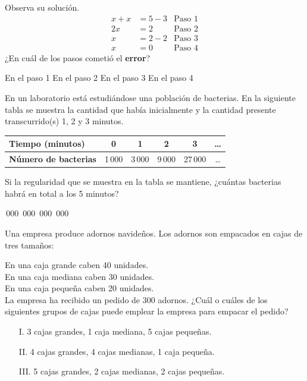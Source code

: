 \documentclass[10pt,letterpaper,addpoints]{exam}
\begin{document}
\begin{questions}
Observa su solución.
\begin{align*}
 x+x&=5-3 & \mbox{Paso 1}\\
 2x&=2 & \mbox{Paso 2}\\
  x&=2-2 & \mbox{Paso 3}\\
  x&=0 & \mbox{Paso 4}
\end{align*}
¿En cuál de los pasos cometió el \textbf{error}?

\begin{oneparchoices}
\choice En el paso 1
\choice En el paso 2
\CorrectChoice En el paso 3
\choice En el paso 4
\end{oneparchoices}
\question En un laboratorio está estudiándose una población de bacterias. En la siguiente tabla se muestra la cantidad que había inicialmente y la cantidad presente transcurrido(s) 1, 2 y 3 minutos.
\begin{center}
\begin{tabular}{|p{2cm}|c|c|c|c|c|}
\hline 
\textbf{Tiempo (minutos)} & \textbf{0} & \textbf{1} & \textbf{2} & \textbf{3} & \textbf{\ldots} \\ 
\hline 
\textbf{Número de bacterias} & 1\,000 & 3\,000 & 9\,000 & 27\,000 & \ldots \\ 
\hline 
\end{tabular} 
\end{center}
Si la regularidad que se muestra en la tabla se mantiene, ¿cuántas bacterias habrá en total a los 5 minutos?

\begin{oneparchoices}
\,000
\,000
\,000
\,000
\end{oneparchoices}
\question Una empresa produce adornos navideños. Los adornos son empacados en cajas de tres tamaños:

En una caja grande caben 40 unidades.\\
En una caja mediana caben 30 unidades.\\
En una caja pequeña caben 20 unidades.  \\

La empresa ha recibido un pedido de 300 adornos. ¿Cuál o cuáles de los siguientes grupos de cajas puede emplear la empresa para empacar el pedido?
\begin{itemize}
\item[I.] 3 cajas grandes, 1 caja mediana, 5 cajas pequeñas.
\item[II.] 4 cajas grandes, 4 cajas medianas, 1 caja pequeña.
\item[III.] 5 cajas grandes, 2 cajas medianas, 2 cajas pequeñas.
\end{itemize}


\end{questions}
\end{document}
